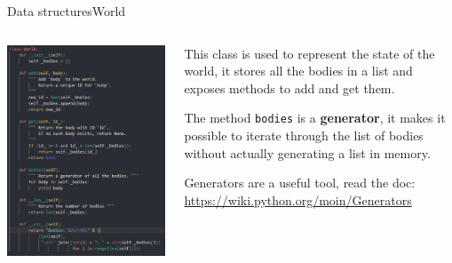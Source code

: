 \documentclass[colorlinks]{beamer}
\begin{document}
\begin{frame}{Data structures}{World}
    \begin{columns}
        \begin{column}{.5\textwidth}
            \centering
            \includegraphics[height=.8\textheight]{World.png}
        \end{column}
        \begin{column}{.5\textwidth}
            This class is used to represent the state of the world, it stores all the bodies in a list and exposes methods to add and get them.
            
            \vspace{1em}
            
            The method \texttt{bodies} is a \textbf{generator}, it makes it possible to iterate through the list of bodies without actually generating a list in memory. 

            \vspace{1em}
            
            Generators are a useful tool, read the doc: \url{https://wiki.python.org/moin/Generators}
        \end{column}
    \end{columns}
\end{frame}
\end{document}
